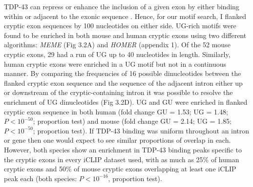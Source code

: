 TDP-43 can repress or enhance the inclusion of a given exon by either binding within or adjacent to the exonic sequence \citep{Tollervey2011}. Hence, for our motif search, I flanked cryptic exon sequences by 100 nucleotides on either side. UG-rich motifs were found to be enriched in both mouse and human cryptic exons using two different algorithms: \emph{MEME} (Fig 3.2A) and \emph{HOMER} (appendix 1). Of the 52 mouse cryptic exons, 29 had a run of UG up to 40 nucleotides in length. Similarly, human cryptic exons were enriched in a UG motif but not in a continuous manner. By comparing  the frequencies of  16 possible dinucleotides between the flanked cryptic exon sequence and the sequence of the adjacent intron either up or downstream of the cryptic-containing intron it was possible to resolve the enrichment of UG dinucleotides (Fig 3.2D). UG and GU were enriched in flanked cryptic exon sequence in both human (fold change GU = 1.53; UG = 1.48; $P < 10^{-50}$; proportion test) and mouse (fold change GU = 2.14; UG = 1.85; $P < 10^{-50}$; proportion test). 
If TDP-43 binding was uniform throughout an intron or gene then one would expect to see similar proportions of overlap in each. However, both species show an enrichment in TDP-43 binding peaks specific to the cryptic exons in every iCLIP dataset used, with as much as 25\% of human cryptic exons and 50\% of mouse cryptic exons overlapping at least one iCLIP peak each (both species: $P < 10^{-16}$, proportion test). 

